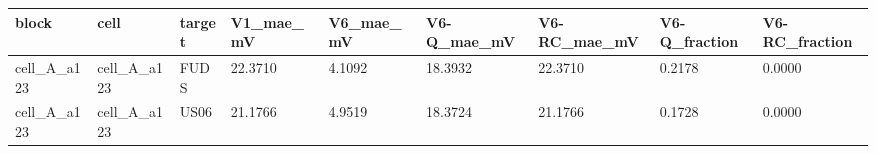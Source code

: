 \begin{tabular}{lllllllll}
\hline
block & cell & target & V1\_mae\_mV & V6\_mae\_mV & V6-Q\_mae\_mV & V6-RC\_mae\_mV & V6-Q\_fraction & V6-RC\_fraction \\
\hline
cell\_A\_a123 & cell\_A\_a123 & FUDS & 22.3710 & 4.1092 & 18.3932 & 22.3710 & 0.2178 & 0.0000 \\
cell\_A\_a123 & cell\_A\_a123 & US06 & 21.1766 & 4.9519 & 18.3724 & 21.1766 & 0.1728 & 0.0000 \\
\hline
\end{tabular}
